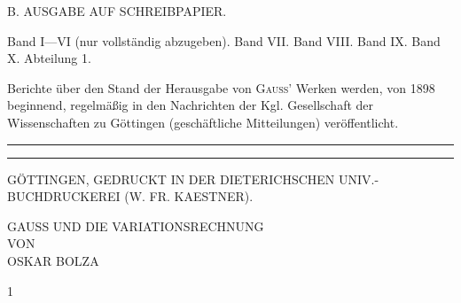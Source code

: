 {\begin{minipage}{\dimexpr\textwidth-2\fboxsep-2\fboxrule\relax}
{\begin{minipage}{\dimexpr\linewidth-2\fboxsep-2\fboxrule\relax}
\begin{center}{\large B. AUSGABE AUF SCHREIBPAPIER.}\end{center}
\noindent Band I—VI (nur vollständig abzugeben). Band VII. Band VIII. Band IX. Band X. Abteilung 1.
\par\smallskip\begin{center}
\end{center}
\par\noindent\hspace*{\parindent}Berichte über den Stand der Herausgabe von \textsc{Gauss}’ Werken werden, von 1898 beginnend, regelmäßig in den Nachrichten der Kgl. Gesellschaft der Wissenschaften zu Göttingen (geschäftliche Mitteilungen) veröffentlicht.
\par\bigskip\noindent\rule{\linewidth}{.3pt}\par\vspace{-6pt}\noindent\rule{\linewidth}{.3pt}
\begin{center}\fontsize{6.5}{8}\selectfont GÖTTINGEN, GEDRUCKT IN DER DIETERICHSCHEN UNIV.-BUCHDRUCKEREI (W. FR. KAESTNER).\end{center}
\end{minipage}}\end{minipage}}
\clearpage{}\NoSourceHead
\begin{center}
\vspace*{.7in}
{\Large GAUSS UND DIE VARIATIONSRECHNUNG}\\[.8in]
VON\\[.8in]
{\large OSKAR BOLZA}
\end{center}
\vfill{}\hfill{\small 1}
\clearpage\endgroup
